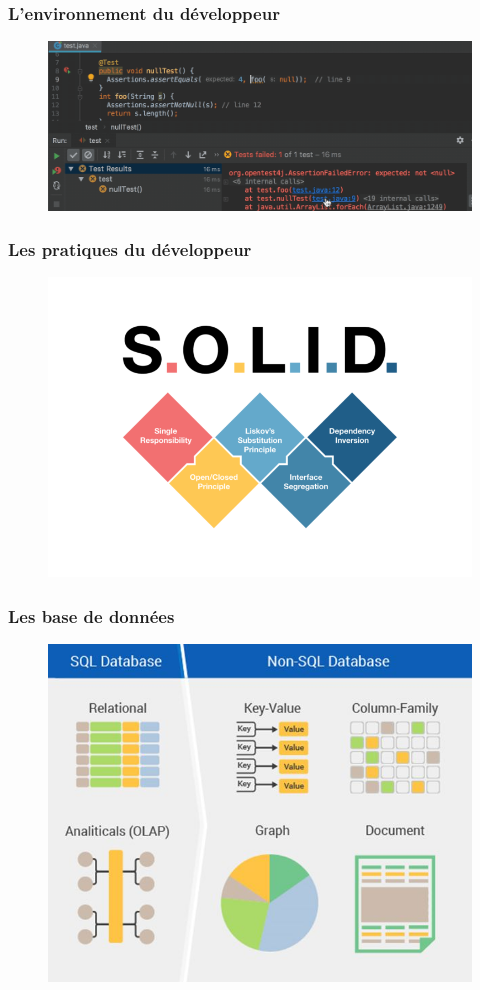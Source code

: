 \begin{frame}
    \frametitle{L'environnement du développeur}

    \begin{figure}
        \centering
        \includegraphics[width=\linewidth]{figures/introduction/intellij}
        \label{fig:environnement}
    \end{figure}
\end{frame}

\begin{frame}
    \frametitle{Les pratiques du développeur}

    \begin{figure}
        \centering
        \includegraphics[height=0.5\linewidth]{figures/introduction/solid}
        \label{fig:pratiques}
    \end{figure}
\end{frame}

\begin{frame}
    \frametitle{Les base de données}

    \begin{figure}
        \centering
        \includegraphics[height=0.5\linewidth]{figures/introduction/database}
        \label{fig:database}
    \end{figure}
\end{frame}

